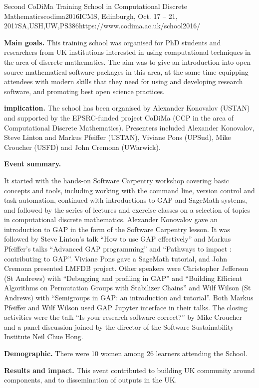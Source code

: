 \begin{event}{Second CoDiMa Training School in Computational Discrete Mathematics}{codima2016}{ICMS, Edinburgh, Oct. 17 -- 21, 2017}{SA,USH,UW,PS}{38}{6}{https://www.codima.ac.uk/school2016/}

\textbf{Main goals.} This training school was organised for PhD students and researchers from
UK institutions interested in using computational techniques in the area of discrete mathematics.
The aim was to give an introduction into open source mathematical software packages in this area,
at the same time equipping attendees with modern skills that they need for using and developing
research software, and promoting best open science practices.

\textbf{\ODK implication.} The school has been organised by Alexander Konovalov (USTAN) and supported
by the EPSRC-funded project CoDiMa (CCP in the area of Computational Discrete Mathematics). Presenters
included Alexander Konovalov, Steve Linton and Markus Pfeiffer (USTAN), Viviane Pons (UPSud),
Mike Croucher (USFD) and John Cremona (UWarwick).

\textbf{Event summary.}

It started with the hands-on Software Carpentry workshop covering basic
concepts and tools, including working with the command line, version control and task automation,
continued with introductions to GAP and SageMath systems, and followed by the series of lectures
and exercise classes on a selection of topics in computational discrete mathematics. Alexander
Konovalov gave an introduction to GAP in the form of the Software Carpentry lesson. It was
followed by Steve Linton's talk ``How to use GAP effectively'' and Markus Pfeiffer's talks
``Advanced GAP programming'' and ``Pathways to impact : contributing to GAP''.
Viviane Pons gave a SageMath tutorial, and John Cremona presented LMFDB project.
Other speakers were Christopher Jefferson (St Andrews) with
``Debugging and profiling in GAP'' and
``Building Efficient Algorithms on Permutation Groups with Stabilizer Chains''
and Wilf Wilson (St Andrews) with ``Semigroups in GAP: an introduction and tutorial''.
Both Markus Pfeiffer and Wilf Wilson used GAP Jupyter interface in their talks.
The closing activities were the talk ``Is your research software correct?'' by Mike Croucher
and a panel discussion joined by the director of the Software Sustainability Institute Neil Chue Hong.

\textbf{Demographic.} There were 10 women among 26 learners attending the School.

\textbf{Results and impact.} This event contributed to building UK community
around \ODK components, and to dissemination of \ODK outputs in the UK.

\end{event}
